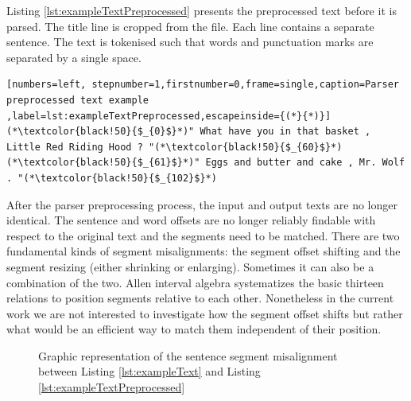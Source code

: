 Listing \ref{lst:exampleTextPreprocessed} presents the preprocessed text before it is parsed. The title line is cropped from the file. Each line contains a separate sentence. The text is tokenised such that words and punctuation marks are separated by a single space.

\begin{lstlisting}[numbers=left, stepnumber=1,firstnumber=0,frame=single,caption=Parser preprocessed text example ,label=lst:exampleTextPreprocessed,escapeinside={(*}{*)}]
(*\textcolor{black!50}{$_{0}$}*)" What have you in that basket , Little Red Riding Hood ? "(*\textcolor{black!50}{$_{60}$}*)
(*\textcolor{black!50}{$_{61}$}*)" Eggs and butter and cake , Mr. Wolf . "(*\textcolor{black!50}{$_{102}$}*)
\end{lstlisting}

After the parser preprocessing process, the input and output texts are no longer identical. The sentence and word offsets are no longer reliably findable with respect to the original text and the segments need to be matched. There are two fundamental kinds of segment misalignments: the segment offset shifting and the segment resizing (either shrinking or enlarging). Sometimes it can also be a combination of the two. Allen interval algebra \citep{Allen1983} systematizes the basic thirteen relations to position segments relative to each other. Nonetheless in the current work we are not interested to investigate how the segment offset shifts but rather what would be an efficient way to match them independent of their position.

\begin{figure}[!ht]
    \centering
    \caption{Graphic representation of the sentence segment misalignment between Listing \ref{lst:exampleText} and Listing \ref{lst:exampleTextPreprocessed} }
    \label{fig:segment-misalignment}
\end{figure}

